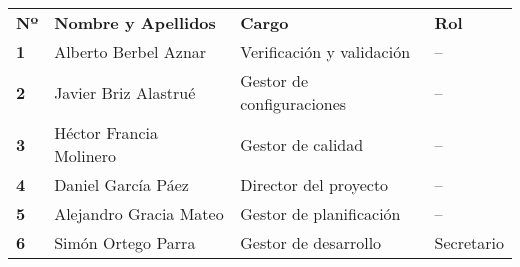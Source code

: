 \begin{longtable}{ | C{\tabcolsep} |
                     L{\tabcolsep} |
                     C{\tabcolsep} |
                     C{\tabcolsep} | }
\hline %
 \\
\hline %
{\bf Nº} & {\bf Nombre y Apellidos} & {\bf Cargo} & {\bf Rol} \\
\hline %
{\bf 1} & Alberto Berbel Aznar & Verificación y validación & --  \\
\hline %
{\bf 2} & Javier Briz Alastrué & Gestor de configuraciones & --  \\
\hline %
{\bf 3} & Héctor Francia Molinero & Gestor de calidad & --  \\
\hline %
{\bf 4} & Daniel García Páez & Director del proyecto & -- \\
\hline %
{\bf 5} & Alejandro Gracia Mateo & Gestor de planificación & --  \\
\hline %
{\bf 6} & Simón Ortego Parra & Gestor de desarrollo & Secretario  \\
\hline %
\end{longtable}

